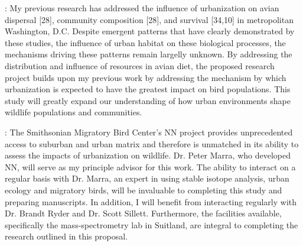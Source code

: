 \documentclass[12pt]{article}
\begin{document}
: 
My previous research has addressed the influence of urbanization on avian dispersal [28], community composition [28], and survival [34,10] in metropolitan Washington, D.C. Despite emergent patterns that have clearly demonstrated by these studies, the influence of urban habitat on these biological processes, the mechanisms driving these patterns remain largelly unknown. By addressing the distribution and influence of resources in avian diet, the proposed research project builds upon my previous work by addressing the mechanism by which urbanization is expected to have the greatest impact on bird populations. This study will greatly expand our understanding of how urban environments shape wildlife populations and communities.


:
The Smithsonian Migratory Bird Center's NN project provides unprecedented access to suburban and urban matrix  and therefore is unmatched in its ability to assess the impacts of urbanization on wildlife. Dr. Peter Marra, who developed NN, will serve as my principle advisor for this work. The ability to interact on a regular basis with Dr. Marra, an expert in using stable isotope analysis, urban ecology and migratory birds, will be invaluable to completing this study and preparing manuscripts. In addition, I will benefit from interacting regularly with Dr. Brandt Ryder and Dr. Scott Sillett.  Furthermore, the facilities available, specifically the mass-spectrometry lab in Suitland, are integral to completing the research outlined in this proposal.
\end{document}
